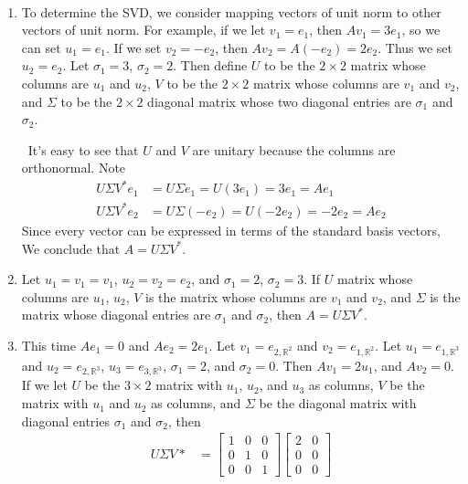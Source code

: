 \documentclass[12pt]{article}
\newenvironment{sol}[1][Solution]{\begin{trivlist}
		\item[\hskip \labelsep {\bfseries #1:}]}{\end{trivlist}}
\begin{document}
\begin{sol}
	\
	\begin{enumerate}[label=(\alph*)]
		\item To determine the SVD, we consider mapping vectors of unit norm to other vectors of unit norm.
		For example, if we let $v_1=e_1$, then $Av_1=3e_1$, so we can set $u_1=e_1$. If we set $v_2=-e_2$,
		then $Av_2=A(-e_2)=2e_2$. Thus we set $u_2 = e_2$. Let $\sigma_1=3$, $\sigma_2=2$. Then define
		$U$ to be the $2\times 2$ matrix whose columns are $u_1$ and $u_2$, $V$ to be the $2\times 2$ matrix
		whose columns are $v_1$ and $v_2$, and $\Sigma$ to be the $2\times 2$ diagonal matrix whose two
		diagonal entries are $\sigma_1$ and $\sigma_2$.
		
		\
		It's easy to see that $U$ and $V$ are unitary because the columns are orthonormal. Note
		\begin{align*}
			U\Sigma V^*e_1 &= U\Sigma e_1=U(3e_1)=3e_1=Ae_1\\
			U\Sigma V^*e_2 &= U\Sigma(-e_2)=U(-2e_2)=-2e_2=Ae_2
		\end{align*}
		Since every vector can be expressed in terms of the standard basis vectors, We conclude that $A=U\Sigma V^*$.
		\item Let $u_1=v_1=v_1$, $u_2=v_2=e_2$, and $\sigma_1=2$, $\sigma_2=3$. If $U$ matrix whose columns
		are $u_1$, $u_2$, $V$ is the matrix whose columns are $v_1$ and $v_2$, and $\Sigma$ is the matrix
		whose diagonal entries are $\sigma_1$ and $\sigma_2$, then $A=U\Sigma V^*$.
		\item This time $Ae_1=0$ and $Ae_2=2e_1$. Let $v_1=e_{2, \mathbb{R}^2}$ and $v_2=e_{1,\mathbb{R}^2}$.
		Let $u_1=e_{1,\mathbb{R}^3}$ and $u_2=e_{2, \mathbb{R}^3}$, $u_3=e_{3,\mathbb{R}^3}$,  $\sigma_1 = 2$, and
		$\sigma_2 = 0$. Then $Av_1=2u_1$, and $Av_2=0$. If we let $U$ be the $3\times 2$ matrix with $u_1$,
		$u_2$, and $u_3$ as columns, $V$ be the matrix with $u_1$ and $u_2$ as columns, and $\Sigma$ be the
		diagonal matrix with diagonal entries $\sigma_1$ and $\sigma_2$, then
		\begin{align*}
			U\Sigma V*&=\begin{bmatrix}
				1 & 0 & 0\\
				0 & 1 & 0\\
				0 & 0 & 1
			\end{bmatrix}
			\begin{bmatrix}
				2 & 0\\
				0 & 0\\
				0 & 0
			\end{bmatrix}

\end{align*}
\end{enumerate}
\end{sol}
\end{document}
